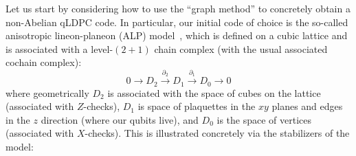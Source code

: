 \documentclass[aps,prx,reprint,superscriptaddress,nofootinbib]{revtex4-2}
\theoremstyle{definition}
\newcommand{\<}{\langle}
\renewcommand{\>}{\rangle}
\begin{document}
Let us start by considering how to use the ``graph method'' to concretely obtain a non-Abelian qLDPC code.
%
In particular, our initial code of choice is the so-called anisotropic lineon-planeon (ALP) model~\cite{xu2004strong, Vijay_2016, Shirley_2019}, which is defined on a cubic lattice and is associated with a level-$(2 + 1)$ chain complex (with the usual associated cochain complex): 
\begin{equation} \label{eq-ALPchaincomplex}
        0\rightarrow D_2\xrightarrow{\partial_2}D_1\xrightarrow{\partial_1}D_0\rightarrow0
\end{equation}
where geometrically $D_2$ is associated with the space of cubes on the lattice (associated with $Z$-checks), $D_1$ is space of plaquettes in the $xy$ planes and edges in the $z$ direction (where our qubits live), and $D_0$ is the space of vertices (associated with $X$-checks).
%
This is illustrated concretely via the stabilizers of the model: 
\end{document}
